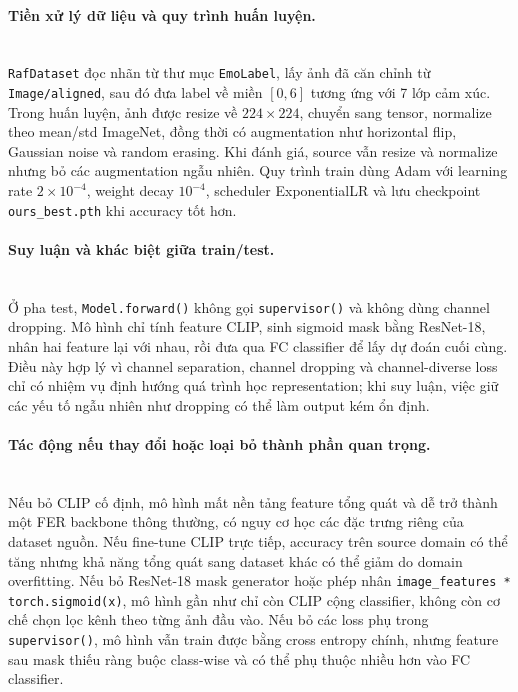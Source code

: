 \paragraph{Tiền xử lý dữ liệu và quy trình huấn luyện.}\mbox{}\\
\texttt{RafDataset} đọc nhãn từ thư mục \texttt{EmoLabel}, lấy ảnh đã căn chỉnh từ \texttt{Image/aligned}, sau đó đưa label về miền \([0,6]\) tương ứng với 7 lớp cảm xúc. Trong huấn luyện, ảnh được resize về \(224 \times 224\), chuyển sang tensor, normalize theo mean/std ImageNet, đồng thời có augmentation như horizontal flip, Gaussian noise và random erasing. Khi đánh giá, source vẫn resize và normalize nhưng bỏ các augmentation ngẫu nhiên. Quy trình train dùng Adam với learning rate \(2 \times 10^{-4}\), weight decay \(10^{-4}\), scheduler ExponentialLR và lưu checkpoint \texttt{ours\_best.pth} khi accuracy tốt hơn.

\paragraph{Suy luận và khác biệt giữa train/test.}\mbox{}\\
Ở pha test, \texttt{Model.forward()} không gọi \texttt{supervisor()} và không dùng channel dropping. Mô hình chỉ tính feature CLIP, sinh sigmoid mask bằng ResNet-18, nhân hai feature lại với nhau, rồi đưa qua FC classifier để lấy dự đoán cuối cùng. Điều này hợp lý vì channel separation, channel dropping và channel-diverse loss chỉ có nhiệm vụ định hướng quá trình học representation; khi suy luận, việc giữ các yếu tố ngẫu nhiên như dropping có thể làm output kém ổn định.

\paragraph{Tác động nếu thay đổi hoặc loại bỏ thành phần quan trọng.}\mbox{}\\
Nếu bỏ CLIP cố định, mô hình mất nền tảng feature tổng quát và dễ trở thành một FER backbone thông thường, có nguy cơ học các đặc trưng riêng của dataset nguồn. Nếu fine-tune CLIP trực tiếp, accuracy trên source domain có thể tăng nhưng khả năng tổng quát sang dataset khác có thể giảm do domain overfitting. Nếu bỏ ResNet-18 mask generator hoặc phép nhân \texttt{image\_features * torch.sigmoid(x)}, mô hình gần như chỉ còn CLIP cộng classifier, không còn cơ chế chọn lọc kênh theo từng ảnh đầu vào. Nếu bỏ các loss phụ trong \texttt{supervisor()}, mô hình vẫn train được bằng cross entropy chính, nhưng feature sau mask thiếu ràng buộc class-wise và có thể phụ thuộc nhiều hơn vào FC classifier.

